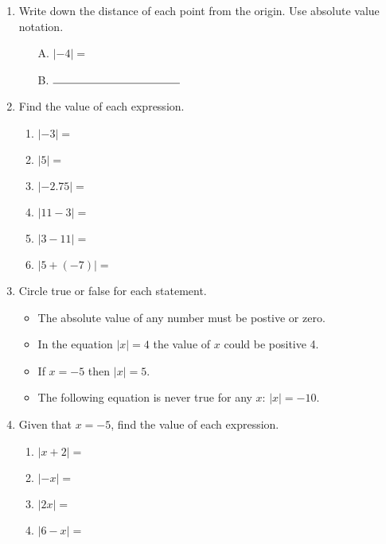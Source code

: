 \documentclass[12pt, twoside]{article}
\begin{document}
\begin{enumerate}[itemsep=0.5cm]
\newpage
\subsubsection*{2.3 Extension: Absolute value}
\item Write down the distance of each point from the origin. Use absolute value notation. \par \bigskip
   \bigskip
  \begin{multicols}{2}
    \begin{enumerate}
      \item[A.] $|-4|=$
      \item[B.] $\rule{4cm}{0.15mm}$
    \end{enumerate}
  \end{multicols}
  
\item Find the value of each expression.
  \begin{multicols}{2}
    \begin{enumerate}[itemsep=1cm]
      \item $|-3|=$
      \item $|5|=$
      \item $|-2.75|=$
      \item $|11-3|=$
      \item $|3-11|=$
      \item $|5+(-7)|=$
    \end{enumerate}
  \end{multicols}

\item Circle true or false for each statement. \bigskip
  \begin{itemize}[label={\textbf{T \; F \;}}, itemsep=0.5cm]
    \item The absolute value of any number must be postive or zero.
    \item In the equation $|x|=4$ the value of $x$ could be positive 4.
    \item If $x=-5$ then $|x|=5$.
    \item The following equation is never true for any $x$: $|x|=-10$.
  \end{itemize} \bigskip

\item Given that $x=-5$, find the value of each expression. \bigskip
  \begin{multicols}{2} 
    \begin{enumerate}[itemsep=1cm]
      \item $|x+2|=$
      \item $|-x|=$
      \item $|2x|=$
      \item $|6-x|=$
    \end{enumerate}
  \end{multicols}


\end{enumerate}
\end{document}
